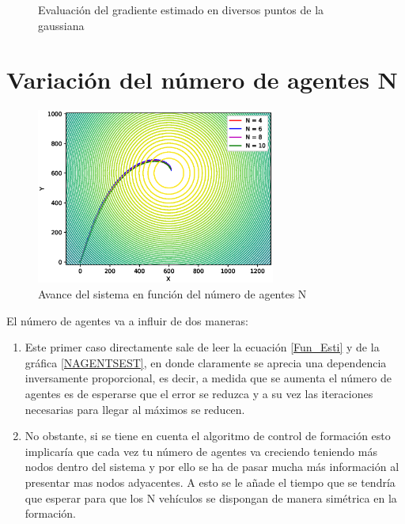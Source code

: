 \begin{figure}[H]
  \begin{center}
    \caption{Evaluación del gradiente estimado en diversos puntos de la gaussiana}
    \label{Gradiente_Diversos_Puntos}
  \end{center}
\end{figure}

\section{Variación del número de agentes N}

\begin{figure}[H]
\centering
\includegraphics[width=0.70\textwidth]{figures/N_Var_R_50/Figure_1.eps}
\caption{Avance del sistema en función del número de agentes N} \label{N_Var}
\end{figure}

El número de agentes va a influir de dos maneras: 

\begin{enumerate}
	\item Este primer caso directamente sale de leer la ecuación \ref{Fun_Esti} y de la gráfica \ref{NAGENTSEST}, en donde claramente se aprecia una dependencia inversamente proporcional, es decir, a medida que se aumenta el número de agentes es de esperarse que el error se reduzca y a su vez las iteraciones necesarias para llegar al máximos se reducen.
	\item No obstante, si se tiene en cuenta el algoritmo de control de formación esto implicaría que cada vez tu número de agentes va creciendo teniendo más nodos dentro del sistema y por ello se ha de pasar mucha más información al presentar mas nodos adyacentes. A esto se le añade el tiempo que se tendría que esperar para que los N vehículos se dispongan de manera simétrica en la formación.
\end{enumerate}

